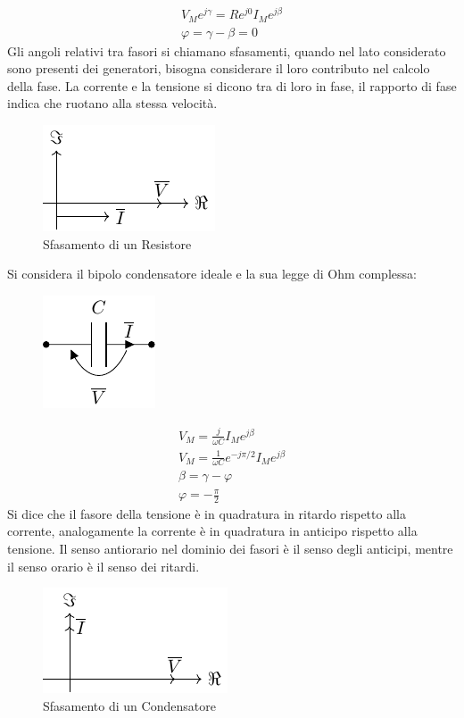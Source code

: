 \documentclass{article}
\numberwithin{equation}{subsection}
\begin{document}
\begin{gather*}
    V_Me^{j\gamma}=Re^{j0}I_Me^{j\beta}\\
    \varphi=\gamma-\beta=0
\end{gather*}
Gli angoli relativi tra fasori si chiamano sfasamenti, quando nel lato considerato sono presenti dei generatori, bisogna 
considerare il loro contributo nel calcolo della fase. La corrente e la tensione si dicono tra di loro in fase, il rapporto di fase indica che ruotano alla stessa velocità. 
\begin{figure}[H]%
    \centering
    \includegraphics{sfasamento-resistore.pdf}
    \caption{Sfasamento di un Resistore}
    \label{fig:sfasamento-resistore}
\end{figure}

Si considera il bipolo condensatore ideale e la sua legge di Ohm complessa:
\begin{figure}[H]%
    \centering
    \includegraphics{condensatore-fasori.pdf}
    \label{fig:condensatore-fasori}
\end{figure}
\begin{gather*}
    V_M=\displaystyle\frac{j}{\omega C}I_Me^{j\beta}\\
    V_M=\displaystyle\frac{1}{\omega C}e^{-j\pi/2}I_Me^{j\beta}\\
    \beta=\gamma-\varphi\\
    \varphi=\displaystyle-\frac{\pi}{2}
\end{gather*}
Si dice che il fasore della tensione è in quadratura in ritardo rispetto alla corrente, analogamente la corrente è in quadratura in anticipo rispetto alla tensione. Il 
senso antiorario nel dominio dei fasori è il senso degli anticipi, mentre il senso orario è il senso dei ritardi. 
\begin{figure}[H]%
    \centering
    \includegraphics{sfasamento-condensatore.pdf}
    \caption{Sfasamento di un Condensatore}
    \label{fig:sfasamento-condensatore}
\end{figure}
\end{document}
